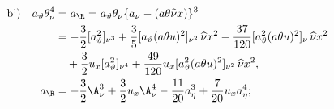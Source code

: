 
\[
\begin{aligned}
\text{b')}\quad
 a_\vartheta\theta_\nu^4
&=a_\R=a_\vartheta\theta_\nu\{a_\nu-(a\theta\widehat{\nu}x)\}^3\\
&=-\frac32[a_\vartheta^2]_{\nu^3}
+\frac35[a_\vartheta(a\theta u)^2]_{\nu^2}\,\widehat{\nu}x^2
-\frac{37}{120}[a_\vartheta^2(a\theta u)^2]_{\nu}\,\widehat{\nu}x^2\\
&\quad+\frac32u_x[a_\vartheta^2]_{\nu^4}
+\frac{49}{120}u_x[a_\vartheta^2(a\theta u)^2]_{\nu^2}\,\widehat{\nu}x^2,\\
a_\R&=-\frac32\A_\nu^3+\frac32u_x\A_\nu^4-\frac{11}{20}a_\eta^3+\frac7{20}u_xa_\eta^4;
\end{aligned}
\]

